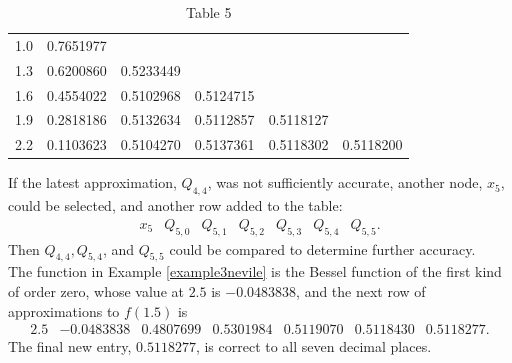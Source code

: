 \begin{table}
\centering
\begin{tabular}{llllll}
\hline
1.0 & 0.7651977 &  &  &  &  \\
1.3 & 0.6200860 & 0.5233449 &  &  &  \\
1.6 & 0.4554022 & 0.5102968 & 0.5124715 &  &  \\
1.9 & 0.2818186 & 0.5132634 & 0.5112857 & 0.5118127 &  \\
2.2 & 0.1103623 & 0.5104270 & 0.5137361 & 0.5118302 & 0.5118200 \\
\hline
\end{tabular}
\caption{\scriptsize Table 5}
\label{tab:datasolnexample2}
\end{table}

If the latest approximation, $Q_{4,4}$, was not sufficiently accurate, another node, $x_{5}$, could be selected, and another row added to the table:
\[\begin{array}{ccccccc}
x_{5} & Q_{5,0} & Q_{5,1} & Q_{5,2} & Q_{5,3} & Q_{5,4} & Q_{5,5} .
\end{array}\]
Then $Q_{4,4}, Q_{5,4}$, and $Q_{5,5}$ could be compared to determine further accuracy.\\

The function in Example \ref{example3nevile} is the Bessel function of the first kind of order zero, whose value at $2.5$ is $-0.0483838$, and the next row of approximations to $f(1.5)$ is
\[\begin{array}{lllllll}
2.5 & -0.0483838 & 0.4807699 & 0.5301984 & 0.5119070 & 0.5118430 & 0.5118277 .
\end{array}\]
The final new entry, $0.5118277$, is correct to all seven decimal places.

